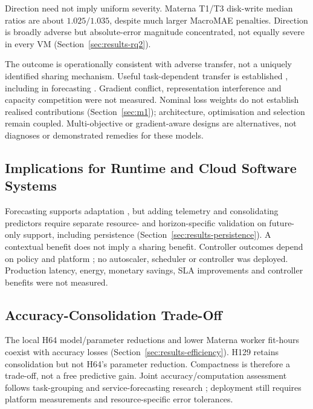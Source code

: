 \documentclass[a4paper,fleqn]{cas-dc}
\begin{document}
Direction need not imply uniform severity. Materna T1/T3 disk-write median
ratios are about $1.025/1.035$, despite much larger MacroMAE penalties.
Direction is broadly adverse but absolute-error magnitude concentrated,
not equally severe in every VM (Section~\ref{sec:results-rq2}).

The outcome is operationally consistent with adverse transfer, not a uniquely
identified sharing mechanism. Useful task-dependent transfer is established
\citep{Caruana1997Multitask,Standley2020TaskGrouping,Fifty2021TaskGroupings},
including in forecasting \citep{Nikentari2022NARMAXLSTM,Nochumsohn2025MTLinear}.
Gradient conflict, representation interference and capacity competition were
not measured. Nominal loss weights do not establish realised contributions
(Section~\ref{sec:m1}); architecture, optimisation and selection remain coupled.
Multi-objective or gradient-aware designs
\citep{Sener2018MultiObjective,Yu2020GradientSurgery} are alternatives, not
diagnoses or demonstrated remedies for these models.

\subsection{Implications for Runtime and Cloud Software Systems}
\label{sec:discussion-systems}

Forecasting supports adaptation \citep{Taherizadeh2018Monitoring,Bauer2020SelfAware},
but adding telemetry and consolidating predictors require separate resource-
and horizon-specific validation on future-only support, including persistence
(Section~\ref{sec:results-persistence}). A contextual benefit does not imply a
sharing benefit. Controller outcomes depend on policy and platform
\citep{Qu2018Autoscaling}; no autoscaler, scheduler or controller was deployed.
Production latency, energy, monetary savings, SLA improvements and controller
benefits were not measured.

\subsection{Accuracy-Consolidation Trade-Off}
\label{sec:discussion-efficiency}

The local H64 model/parameter reductions and lower Materna worker fit-hours
coexist with accuracy losses (Section~\ref{sec:results-efficiency}).
H129 retains consolidation but not H64's parameter reduction. Compactness is
therefore a trade-off, not a free predictive gain. Joint accuracy/computation
assessment follows task-grouping and service-forecasting research
\citep{Standley2020TaskGrouping,Syu2017DynamicQoS}; deployment still requires
platform measurements and resource-specific error tolerances.
\end{document}
